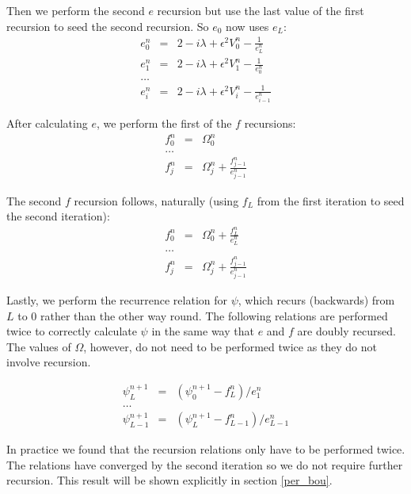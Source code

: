 \noindent Then we perform the second $e$ recursion but use the last value of the first recursion to seed the second recursion. So $e_0$ now uses $e_L$:
\begin{eqnarray}
e_{0}^n &=& 2 -i\lambda +\epsilon^2 V_{0}^{n}- \frac{1}{e_{L}^n} \nonumber \\
e_{1}^n &=& 2 -i\lambda +\epsilon^2 V_{1}^{n} - \frac{1}{e_{0}^n} \nonumber \\
\ldots \nonumber \\
e_{i}^n &=& 2 -i\lambda +\epsilon^2 V_{i}^{n} - \frac{1}{e_{i-1}^n}
\end{eqnarray}

\noindent After calculating $e$, we perform the first of the $f$ recursions:
\begin{eqnarray}
f_{0}^n &=&  \Omega_{0}^n \nonumber \\
\ldots \nonumber \\
f_{j}^n &=&  \Omega_{j}^n +  \frac{f_{j-1}^n}{e_{j-1}^n}
\end{eqnarray}

\noindent The second $f$ recursion follows, naturally (using $f_L$ from the first iteration to seed the second iteration):
\begin{eqnarray}
f_{0}^n &=&  \Omega_{0}^n +  \frac{f_{L}^n}{e_{L}^n} \nonumber \\
\ldots \nonumber \\
f_{j}^n &=&  \Omega_{j}^n +  \frac{f_{j-1}^n}{e_{j-1}^n}
\end{eqnarray}

\noindent Lastly, we perform the recurrence relation for $\psi$, which recurs (backwards) from $L$ to $0$ rather than the other way round. The following relations are performed twice to correctly calculate $\psi$ in the same way that $e$ and $f$ are doubly recursed. The values of $\Omega$, however, do not need to be performed twice as they do not involve recursion.

\begin{eqnarray}
\psi_{L}^{n+1} &=&  (\psi_{0}^{n+1} -f_{L}^n)/e_{1}^n \nonumber \\
\ldots \nonumber \\
\psi_{L-1}^{n+1} &=& (\psi_{L}^{n+1} -f_{L-1}^n)/e_{L-1}^n
\end{eqnarray}

In practice we found that the recursion relations only have to be performed twice. The relations have converged by the second iteration so we do not require further recursion. This result will be shown explicitly in section \ref{per_bou}.

